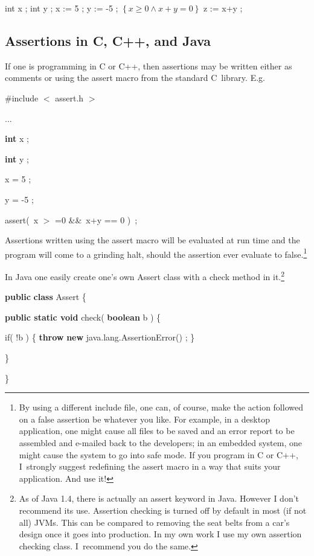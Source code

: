 \documentclass[11pt]{article}%
\begin{document}
\begin{code}
int x ; int y ; x := 5 ; y := -5 ; $\left\{  x\geq0\wedge x+y=0\right\}  $ z
:= x+y ;
\end{code}

\subsection{Assertions in C, C++, and Java}

If one is programming in C or C++, then assertions may be written either as
comments or using the assert macro from the standard C\ library. E.g.

\begin{code}
\#include
$<$%
assert.h%
$>$%


...

\textbf{int} x ;

\textbf{int} y ;

x = 5 ;

y = -5 ;

assert(\ x
$>$%
=0 \&\&\ x+y == 0 )\ ;
\end{code}

\noindent Assertions written using the \textsf{assert} macro will be evaluated
at run time and the program will come to a grinding halt, should the assertion
ever evaluate to false.\footnote{By using a different include file, one can,
of course, make the action followed on a false assertion be whatever you like.
For example, in a desktop application, one might cause all files to be saved
and an error report to be assembled and e-mailed back to the developers; in an
embedded system, one might cause the system to go into safe mode. If you
program in C or C++, I\ strongly suggest redefining the assert macro in a way
that suits your application. And use it!}

In Java one easily create one's own \textsf{Assert} class with a
\textsf{check} method in it.\footnote{As of Java 1.4, there is actually an
\textsf{assert} keyword in Java. However I don't recommend its use. Assertion
checking is turned off by default in most (if not all) JVMs. This can be
compared to removing the seat belts from a car's design once it goes into
production. In my own work I use my own assertion checking class. I\ recommend
you do the same.}

\begin{code}
\textbf{public} \textbf{class} Assert \{

\begin{indent}
\item \textbf{public static void} check( \textbf{boolean} b ) \{

\begin{indent}
\item if( !b ) \{ \textbf{throw} \textbf{new} java.lang.AssertionError() ; \}
\end{indent}

\item \}
\end{indent}

\}
\end{code}
\end{document}
